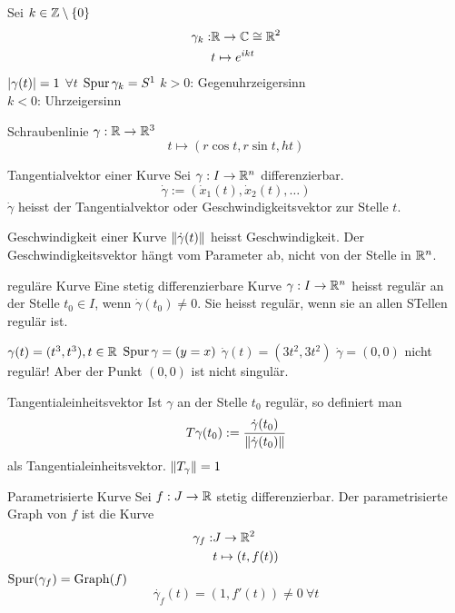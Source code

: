 \begin{Bsp}
  Sei $k\in\mathbb{Z}\setminus\{0\}$
  \begin{align*}
    \gamma_k:&\mathbb{R}\to\mathbb{C}\cong \mathbb{R}^2\\
    &t\mapsto e^{ikt}
  \end{align*}
  $\left| \gamma(t) \right|=1$ $\forall t$ $\operatorname{Spur}\gamma_k=S^1$
  $k>0$: Gegenuhrzeigersinn\\
  $k<0$: Uhrzeigersinn
\end{Bsp}
\begin{Bsp}{Schraubenlinie}
  $\gamma:\mathbb{R}\to\mathbb{R}^3$
  \[t\mapsto (r\cos t, r\sin t, h t)\]
\end{Bsp}
\begin{Def}{Tangentialvektor einer Kurve}
  Sei $\gamma:I\to\mathbb{R}^n$ differenzierbar.
  \[\dot{\gamma}:=(\dot{x}_1(t),\dot{x}_2(t),\dots)\]
  $\dot{\gamma}$ heisst der Tangentialvektor oder Geschwindigkeitsvektor zur Stelle $t$.
\end{Def}
\begin{Def}{Geschwindigkeit einer Kurve}
  $\left\| \dot{\gamma}(t) \right\|$ heisst Geschwindigkeit. Der Geschwindigkeitsvektor hängt vom Parameter ab, nicht von der Stelle in $\mathbb{R}^n$.
\end{Def}
\begin{Def}{reguläre Kurve}
  Eine stetig differenzierbare Kurve $\gamma:I\to\mathbb{R}^n$ heisst regulär an der Stelle $t_0\in I$, wenn $\dot{\gamma}(t_0)\neq 0$. Sie heisst regulär, wenn sie an allen STellen regulär ist.
\end{Def}
\begin{Bsp}
  $\gamma(t)=(t^3,t^3), t\in\mathbb{R}$ $\operatorname{Spur} \gamma= (y=x)$ $\dot{\gamma}(t)=(3t^2,3t^2)$ $\dot{\gamma}=(0,0)$ nicht regulär! Aber der Punkt $(0,0)$ ist nicht singulär.
\end{Bsp}
\begin{Def}{Tangentialeinheitsvektor}
  Ist $\gamma$ an der Stelle $t_0$ regulär, so definiert man
  \[T\gamma(t_0):=\frac{\dot{\gamma}(t_0)}{\left\| \dot{\gamma}(t_0) \right\|}\]
  als Tangentialeinheitsvektor. $\left\| T_\gamma \right\|=1$
\end{Def}
\begin{Def}{Parametrisierte Kurve}
  Sei $f:J\to\mathbb{R}$ stetig differenzierbar. Der parametrisierte Graph von $f$ ist die Kurve
  \begin{align*}
    \gamma_f:&J\to\mathbb{R}^2\\
    &t\mapsto (t,f(t))
  \end{align*}
  $\operatorname{Spur}(\gamma_f)=\operatorname{Graph} (f)$
  \[\dot{\gamma_f}(t)=(1,f'(t))\neq 0\ \forall t\]
\end{Def}

